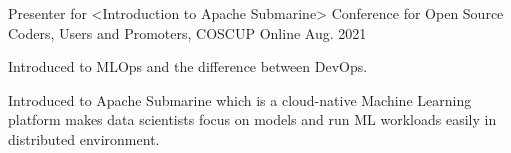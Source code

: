 

\begin{cventries}

  \cventry
    {Presenter for <Introduction to Apache Submarine>} %
    {Conference for Open Source Coders, Users and Promoters, COSCUP} %
    {Online} %
    {Aug. 2021} %
    {
      \begin{cvitems} %
        \item {Introduced to MLOps and the difference between DevOps.}
        \item {Introduced to Apache Submarine which is a cloud-native Machine Learning platform makes data scientists focus on models and run ML workloads easily in distributed environment.}
      \end{cvitems}
    }
\end{cventries}
